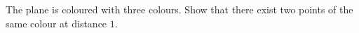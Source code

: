 The plane is coloured with three colours. Show that there exist two points of the same colour at distance $1$.
